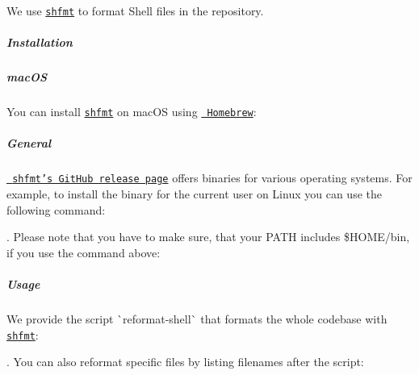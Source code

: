 We use \href{https://github.com/mvdan/sh}{\texttt{ {\ttfamily shfmt}}} to format Shell files in the repository.

\label{doc_CODING_md_autotoc_md1008}%
%
\subparagraph*{Installation}

\subparagraph*{mac\+OS}

You can install \href{https://github.com/mvdan/sh}{\texttt{ {\ttfamily shfmt}}} on mac\+OS using \href{https://brew.sh}{\texttt{ Homebrew}}\+:


\begin{DoxyCode}{0}
\end{DoxyCode}


\subparagraph*{General}

\href{https://github.com/mvdan/sh/releases}{\texttt{ shfmt’s Git\+Hub release page}} offers binaries for various operating systems. For example, to install the binary for the current user on Linux you can use the following command\+:


\begin{DoxyCode}{0}
\end{DoxyCode}


. Please note that you have to make sure, that your {\ttfamily P\+A\+TH} includes {\ttfamily \$\+H\+O\+ME/bin}, if you use the command above\+:


\begin{DoxyCode}{0}
\end{DoxyCode}


\label{doc_CODING_md_autotoc_md1009}%
%
\subparagraph*{Usage}

We provide the script \`{}reformat-\/shell\`{} that formats the whole codebase with \href{https://github.com/mvdan/sh}{\texttt{ {\ttfamily shfmt}}}\+:


\begin{DoxyCode}{0}
\end{DoxyCode}


. You can also reformat specific files by listing filenames after the script\+:

